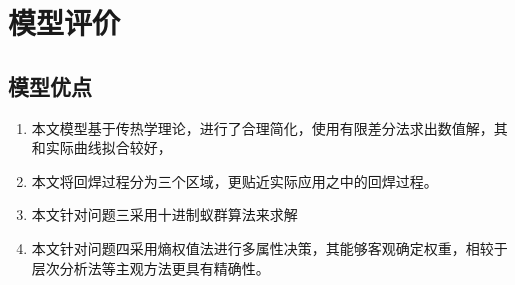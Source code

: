 \section{模型评价}
\subsection{模型优点}
\begin{enumerate}
\item 本文模型基于传热学理论，进行了合理简化，使用有限差分法求出数值解，其和实际曲线拟合较好，
\item 本文将回焊过程分为三个区域，更贴近实际应用之中的回焊过程。
\item 本文针对问题三采用十进制蚁群算法来求解
\item 本文针对问题四采用熵权值法进行多属性决策，其能够客观确定权重，相较于层次分析法等主观方法更具有精确性。
\end{enumerate}

